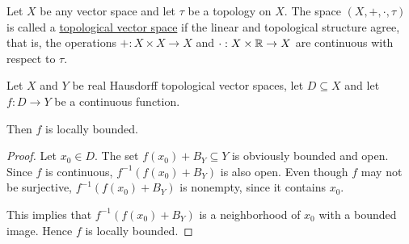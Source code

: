 \begin{definition}\label{def:topological_vector_space}
  Let $X$ be any vector space and let $\tau$ be a topology on $X$. The space $(X, +, \cdot, \tau)$ is called a \uline{topological vector space} if the linear and topological structure agree, that is, the operations $+: X \times X \to X$ and $\cdot: X \times \mathbb R \to X$ are continuous with respect to $\tau$.
\end{definition}

\begin{proposition}\label{thm:continuous_implies_locally_bounded}
  Let $X$ and $Y$ be real Hausdorff topological vector spaces, let $D \subseteq X$ and let $f: D \to Y$ be a continuous function.

  Then $f$ is locally bounded.
\end{proposition}
\begin{proof}
  Let $x_0 \in D$. The set $f(x_0) + B_Y \subseteq Y$ is obviously bounded and open. Since $f$ is continuous, $f^{-1}(f(x_0) + B_Y)$ is also open. Even though $f$ may not be surjective, $f^{-1}(f(x_0) + B_Y)$ is nonempty, since it contains $x_0$.

  This implies that $f^{-1}(f(x_0) + B_Y)$ is a neighborhood of $x_0$ with a bounded image. Hence $f$ is locally bounded.
\end{proof}
